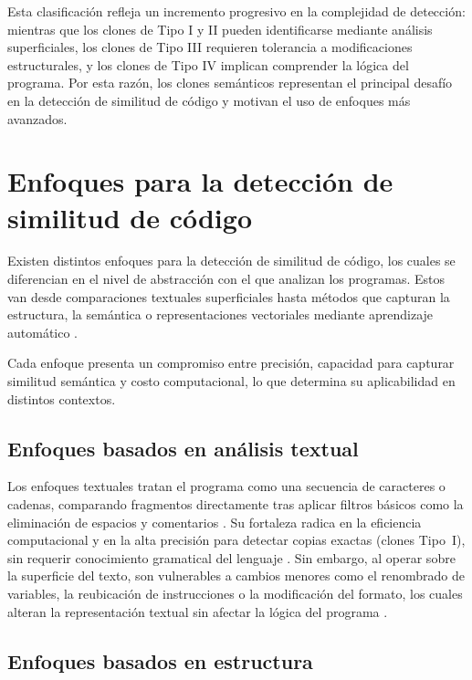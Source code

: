Esta clasificación refleja un incremento progresivo en la complejidad de detección: mientras que los clones de Tipo I y II pueden identificarse mediante análisis superficiales, los clones de Tipo III requieren tolerancia a modificaciones estructurales, y los clones de Tipo IV implican comprender la lógica del programa. Por esta razón, los clones semánticos representan el principal desafío en la detección de similitud de código y motivan el uso de enfoques más avanzados.

\section{Enfoques para la detección de similitud de código}

Existen distintos enfoques para la detección de similitud de código, los cuales se diferencian en el nivel de abstracción con el que analizan los programas. Estos van desde comparaciones textuales superficiales hasta métodos que capturan la estructura, la semántica o representaciones vectoriales mediante aprendizaje automático \cite{Roy2007Survey}.

Cada enfoque presenta un compromiso entre precisión, capacidad para capturar similitud semántica y costo computacional, lo que determina su aplicabilidad en distintos contextos.

\subsection{Enfoques basados en análisis textual}

Los enfoques textuales tratan el programa como una secuencia de caracteres 
o cadenas, comparando fragmentos directamente tras aplicar filtros básicos 
como la eliminación de espacios y comentarios \cite{Roy2007Survey}. Su 
fortaleza radica en la eficiencia computacional y en la alta precisión para 
detectar copias exactas (clones Tipo~I), sin requerir conocimiento 
gramatical del lenguaje \cite{Roy2007Survey, karakatic2022software}. 
Sin embargo, al operar sobre la superficie del texto, son vulnerables a 
cambios menores como el renombrado de variables, la reubicación de 
instrucciones o la modificación del formato, los cuales alteran la 
representación textual sin afectar la lógica del programa \cite{Roy2007Survey}.

\subsection{Enfoques basados en estructura}

